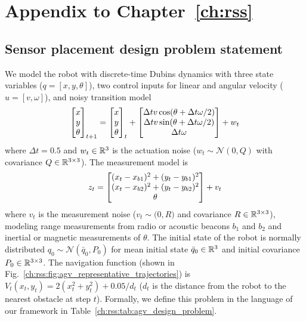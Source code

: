 \chapter{Appendix to Chapter~\ref{ch:rss}}

\section{Sensor placement design problem statement}

We model the robot with discrete-time Dubins dynamics with three state variables ($q = [x, y, \theta]$), two control inputs for linear and angular velocity ($u = [v, \omega]$), and noisy transition model
\begin{align*}
    \begin{bmatrix}x \\ y \\ \theta\end{bmatrix}_{t+1} = \begin{bmatrix}x \\ y \\ \theta\end{bmatrix}_{t} + \begin{bmatrix}\Delta t v \cos(\theta + \Delta t \omega / 2) \\ \Delta t v \sin(\theta + \Delta t \omega / 2) \\ \Delta t \omega\end{bmatrix} + w_t
\end{align*}
where $\Delta t = 0.5$ and $w_t \in \mathbb{R}^3$ is the actuation noise ($w_t \sim \mathcal{N}(0, Q)$ with covariance $Q \in \mathbb{R}^{3\times3}$). The measurement model is
\begin{align*}
    z_t = \begin{bmatrix}(x_t - x_{b1})^2 + (y_t - y_{b1})^2 \\ (x_t - x_{b2})^2 + (y_t - y_{b2})^2 \\ \theta\end{bmatrix} + v_t
\end{align*}
where $v_t$ is the measurement noise ($v_t \sim \mathcal(0, R)$ and covariance $R \in \mathbb{R}^{3\times3}$), modeling range measurements from radio or acoustic beacons $b_1$ and $b_2$ and inertial or magnetic measurements of $\theta$. The initial state of the robot is normally distributed $q_0 \sim \mathcal{N}(\bar{q}_0, P_0)$ for mean initial state $\bar{q}_0 \in \mathbb{R}^3$ and initial covariance $P_0 \in \mathbb{R}^{3\times3}$. The navigation function (shown in Fig.~\ref{ch:rss:fig:agv_representative_trajectories}) is $V_t(x_t, y_t) = 2 (x_t^2 + y_t^2) + 0.05 / d_t$ ($d_t$ is the distance from the robot to the nearest obstacle at step $t$). Formally, we define this problem in the language of our framework in Table~\ref{ch:rss:tab:agv_design_problem}.

